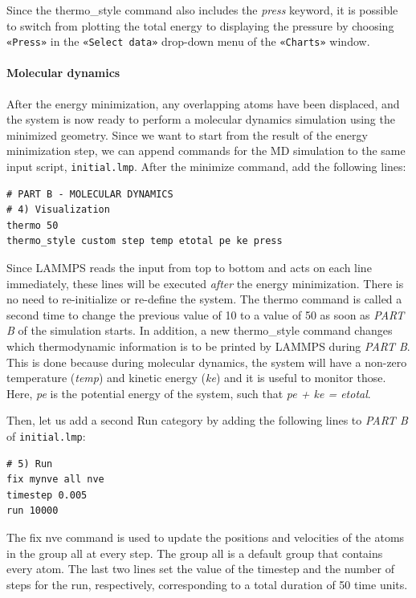 \documentclass[9pt,tutorial]{livecoms}
\newcommand{\lmpcmd}[1]{\hspace{0pt}\colorbox{listing}{\textcolor{command}{\small{#1}}}\hspace{0pt}} %
\newcommand{\flecmd}[1]{\textcolor{command}{\texttt{#1}}} %
\newcommand{\guicmd}[1]{\textcolor{command}{\texttt{«#1»}}} %
\begin{document}
Since the \lmpcmd{thermo\_style} command also includes the \textit{press}
keyword, it is possible to switch from plotting the total energy to
displaying the pressure by choosing \guicmd{Press} in the \guicmd{Select data}
drop-down menu of the \guicmd{Charts} window.

\paragraph{Molecular dynamics}

After the energy minimization, any overlapping atoms have been
displaced, and the system is now ready to perform a molecular dynamics
simulation using the minimized geometry.  Since we want to start from
the result of the energy minimization step, we can append commands for
the MD simulation to the same input script, \flecmd{initial.lmp}.  After
the \lmpcmd{minimize} command, add the following lines:
\begin{lstlisting}
# PART B - MOLECULAR DYNAMICS
# 4) Visualization
thermo 50
thermo_style custom step temp etotal pe ke press
\end{lstlisting}

Since LAMMPS reads the input from top to bottom and acts on each line
immediately, these lines will be executed \emph{after} the energy
minimization.  There is no need to re-initialize or re-define the
system.  The \lmpcmd{thermo} command is called a second time to change
the previous value of 10 to a value of 50 as soon as \textit{PART B} of
the simulation starts.  In addition, a new \lmpcmd{thermo\_style}
command changes which thermodynamic information is to be printed by LAMMPS
during \textit{PART B}.  This is done because during molecular
dynamics, the system will have a non-zero temperature (\textit{temp})
and kinetic energy (\textit{ke}) and it is useful to monitor those.
Here, \textit{pe} is the potential energy of the system, such that
\textit{pe + ke = etotal}.

Then, let us add a second \lmpcmd{Run} category by adding the following
lines to \emph{PART B} of \flecmd{initial.lmp}:
\begin{lstlisting}
# 5) Run
fix mynve all nve
timestep 0.005
run 10000
\end{lstlisting}
The \lmpcmd{fix nve} command is used to update the positions and
velocities of the atoms in the group \lmpcmd{all} at every step.  The
group \lmpcmd{all} is a default group that contains every atom.  The
last two lines set the value of the \lmpcmd{timestep} and the number of
steps for the \lmpcmd{run}, respectively, corresponding to a total
duration of 50 time units.
\end{document}
